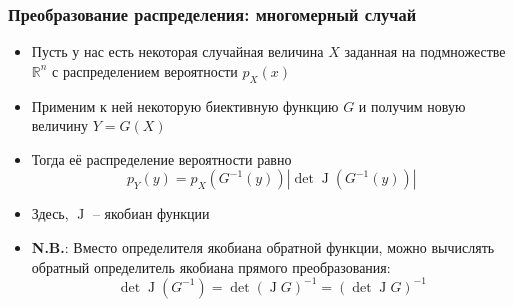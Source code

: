 \documentclass[handout,10pt]{beamer}
\begin{document}
\begin{frame}[fragile]
\frametitle{Преобразование распределения: многомерный случай}
\begin{itemize}
\item Пусть у нас есть некоторая случайная величина \begin{math}X\end{math} заданная на подмножестве \begin{math}\mathbb R^n\end{math} с распределением вероятности \begin{math}p_X(x)\end{math}
\pause
\item Применим к ней некоторую биективную функцию \begin{math}G\end{math} и получим новую величину \begin{math}Y = G(X)\end{math}
\pause
\item Тогда её распределение вероятности равно
\begin{equation*}
p_Y(y) = p_X(G^{-1}(y))\left|\det \operatorname J(G^{-1}(y))\right|
\end{equation*}
\pause
\item Здесь, \begin{math}\operatorname J\end{math} -- якобиан функции
\pause
\item \alert{\textbf{N.B.}}: Вместо определителя якобиана обратной функции, можно вычислять обратный определитель якобиана прямого преобразования:
\begin{equation*}
\det \operatorname J (G^{-1}) = \det \left(\operatorname J G\right)^{-1} = \left(\det \operatorname J G\right)^{-1}
\end{equation*}
\end{itemize}
\end{frame}
\end{document}

